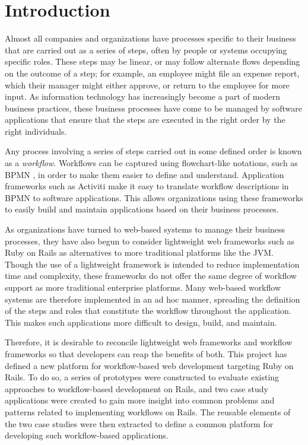 \documentclass[document.tex]{subfiles}
\begin{document}
\chapter{Introduction}

Almost all companies and organizations have processes specific to their business that are carried out as a series of steps, often by people or systems occupying specific roles.
These steps may be linear, or may follow alternate flows depending on the outcome of a step; for example, an employee might file an expense report, which their manager might either approve, or return to the employee for more input.
As information technology has increasingly become a part of modern business practices, these business processes have come to be managed by software applications that ensure that the steps are executed in the right order by the right individuals.

Any process involving a series of steps carried out in some defined order is known as a \emph{workflow}.
Workflows can be captured using flowchart-like notations, such as BPMN \cite{bpmn}, in order to make them easier to define and understand.
Application frameworks such as Activiti \cite{activiti} make it easy to translate workflow descriptions in BPMN to software applications.
This allows organizations using these frameworks to easily build and maintain applications based on their business processes.

As organizations have turned to web-based systems to manage their business processes, they have also begun to consider lightweight web frameworks such as Ruby on Rails \cite{rails} as alternatives to more traditional platforms like the JVM.
Though the use of a lightweight framework is intended to reduce implementation time and complexity, these frameworks do not offer the same degree of workflow support as more traditional enterprise platforms.
Many web-based workflow systems are therefore implemented in an ad hoc manner, spreading the definition of the steps and roles that constitute the workflow throughout the application.
This makes such applications more difficult to design, build, and maintain.

Therefore, it is desirable to reconcile lightweight web frameworks and workflow frameworks so that developers can reap the benefits of both. This project has defined a new platform for workflow-based web development targeting Ruby on Rails. To do so, a series of prototypes were constructed to evaluate existing approaches to workflow-based development on Rails, and two case study applications were created to gain more insight into common problems and patterns related to implementing workflows on Rails. The reusable elements of the two case studies were then extracted to define a common platform for developing such workflow-based applications.
\end{document}

